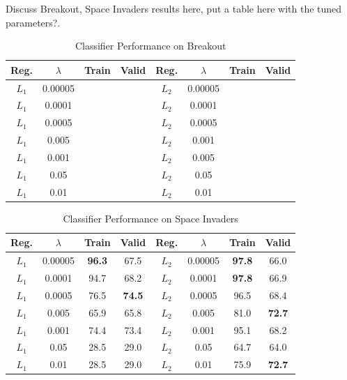 \documentclass[letterpaper, 10pt, conference]{ieeeconf}
\begin{document}
Discuss Breakout, Space Invaders results here, put a table here with the tuned
parameters?.

\begin{table}[!t]
\renewcommand{\arraystretch}{1.3}
\caption{Classifier Performance on Breakout}
\label{tab:breakout}
\centering
\begin{tabular}{c c c c | c c c c}
\hline
Reg.  & $\lambda$ & Train & Valid & Reg.  & $\lambda$ & Train & Valid \\
\hline
$L_1$ & 0.00005   &   &   & $L_2$ & 0.00005   &   &  \\
$L_1$ & 0.0001    &   &   & $L_2$ & 0.0001    &   &  \\
$L_1$ & 0.0005    &   &   & $L_2$ & 0.0005    &   &  \\
$L_1$ & 0.005     &   &   & $L_2$ & 0.001     &   &  \\
$L_1$ & 0.001     &   &   & $L_2$ & 0.005     &   &  \\
$L_1$ & 0.05      &   &   & $L_2$ & 0.05      &   &  \\
$L_1$ & 0.01      &   &   & $L_2$ & 0.01      &   &  \\
\hline
\end{tabular}
\end{table}

\begin{table}[!t]
\renewcommand{\arraystretch}{1.3}
\caption{Classifier Performance on Space Invaders}
\label{tab:space_invaders}
\centering
\begin{tabular}{c c c c | c c c c}
\hline
Reg.  & $\lambda$ & Train & Valid & Reg.  & $\lambda$ & Train & Valid \\
\hline
$L_1$ & 0.00005   & \textbf{96.3}  & 67.5  & $L_2$ & 0.00005   & \textbf{97.8}  & 66.0 \\
$L_1$ & 0.0001    & 94.7  & 68.2  & $L_2$ & 0.0001    & \textbf{97.8}  & 66.9 \\
$L_1$ & 0.0005    & 76.5  & \textbf{74.5}  & $L_2$ & 0.0005    & 96.5  & 68.4 \\
$L_1$ & 0.005     & 65.9  & 65.8  & $L_2$ & 0.005     & 81.0  & \textbf{72.7} \\
$L_1$ & 0.001     & 74.4  & 73.4  & $L_2$ & 0.001     & 95.1  & 68.2 \\
$L_1$ & 0.05      & 28.5  & 29.0  & $L_2$ & 0.05      & 64.7  & 64.0 \\
$L_1$ & 0.01      & 28.5  & 29.0  & $L_2$ & 0.01      & 75.9  & \textbf{72.7} \\
\hline
\end{tabular}
\end{table}
\end{document}
